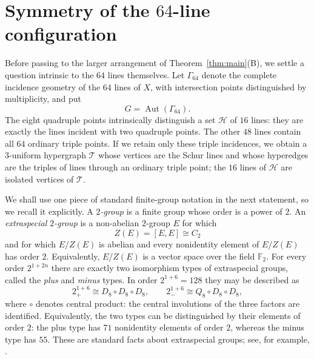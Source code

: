 \documentclass[10pt]{article}
\newcommand{\Aut}{\operatorname{Aut}}
\begin{document}
\section{Symmetry of the $64$-line configuration}

Before passing to the larger arrangement of Theorem~\ref{thm:main}\textup{(B)}, we settle a question intrinsic to the $64$ lines themselves.  Let $\Gamma_{64}$ denote the complete incidence geometry of the $64$ lines of $X$, with intersection points distinguished by multiplicity, and put
\[
G=\Aut(\Gamma_{64}).
\]
The eight quadruple points intrinsically distinguish a set $\mathcal H$ of $16$ lines: they are exactly the lines incident with two quadruple points.  The other $48$ lines contain all $64$ ordinary triple points.  If we retain only these triple incidences, we obtain a $3$-uniform hypergraph $\mathcal T$ whose vertices are the Schur lines and whose hyperedges are the triples of lines through an ordinary triple point; the $16$ lines of $\mathcal H$ are isolated vertices of $\mathcal T$.

We shall use one piece of standard finite-group notation in the next
statement, so we recall it explicitly. A \emph{$2$-group} is a finite group whose order is a power of $2$.
An \emph{extraspecial $2$-group} is a non-abelian $2$-group $E$ for which
\[
Z(E)=[E,E]\cong C_2
\]
and for which $E/Z(E)$ is abelian and every nonidentity element of
$E/Z(E)$ has order $2$.  Equivalently, $E/Z(E)$ is a vector space over
the field $\mathbb F_2$. For every
order $2^{1+2n}$ there are exactly two isomorphism types of extraspecial
groups, called the \emph{plus} and \emph{minus} types.  In order
$2^{1+6}=128$ they may be described as
\[
2_{+}^{1+6}\cong D_8\circ D_8\circ D_8,
\qquad
2_{-}^{1+6}\cong Q_8\circ D_8\circ D_8,
\]
where $\circ$ denotes central product: the central involutions of the
three factors are identified.  Equivalently, the two types can be
distinguished by their elements of order $2$: the plus type has $71$
nonidentity elements of order $2$, whereas the minus type has $55$.
These are standard facts about extraspecial groups; see, for example,
\cite{Atlas85}.
\end{document}
